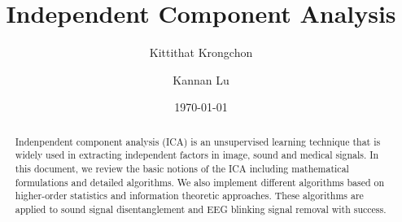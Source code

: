 \documentclass[aps,prl,preprint,superscriptaddress]{revtex4-2}
\begin{document}

\title{Independent Component Analysis}



\author{Kittithat Krongchon}
\author{Kannan Lu}


\date{\today}

\begin{abstract}
Indenpendent component analysis (ICA) is an unsupervised learning technique that is widely used in extracting independent factors in image, sound and medical signals. In this document, we review the basic notions of the ICA including mathematical formulations and detailed algorithms. We also implement different algorithms based on higher-order statistics and information theoretic approaches. These algorithms are applied to sound signal disentanglement and EEG blinking signal removal with success.     
\end{abstract}

\maketitle
\end{document}
